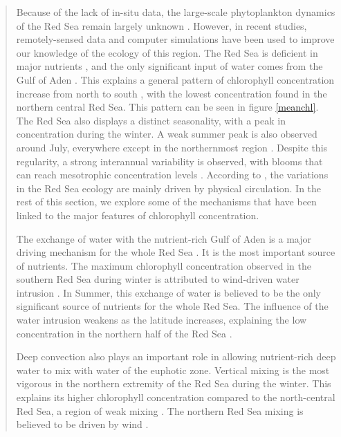 \begin{quotation}
Because of the lack of in-situ data, the large-scale phytoplankton dynamics of
the Red Sea remain largely unknown \citep{Raitsos2013, Triantafyllou2014}.
However, in recent studies, remotely-sensed data and computer simulations have
been used to improve our knowledge of the ecology of this region. The Red Sea
is deficient in major nutrients \citep{Weikert1987}, and the only significant
input of water comes from the Gulf of Aden \citep{Yao2015}. This explains a
general pattern of chlorophyll concentration increase from north to south
\citep{Raitsos2013}, with the lowest concentration found in the northern
central Red Sea. This pattern can be seen in figure \ref{meanchl}.  The Red Sea
also displays a distinct seasonality, with a peak in concentration during the
winter.  A weak summer peak is also observed around July, everywhere except in
the northernmost region \citep{Raitsos2013}. Despite this regularity, a strong
interannual variability is observed, with blooms that can reach mesotrophic
concentration levels \citep{Raitsos2013}. According to
\citet{Triantafyllou2014}, the variations in the Red Sea ecology are mainly
driven by physical circulation. In the rest of this section, we explore some of
the mechanisms that have been linked to the major features of chlorophyll
concentration.


The exchange of water with the nutrient-rich Gulf of Aden is a major driving
mechanism for the whole Red Sea \citep{Triantafyllou2014}. It is the most
important source of nutrients. The maximum chlorophyll concentration observed
in the southern Red Sea during winter is attributed to wind-driven water
intrusion \citep{Raitsos2013}. In Summer, this exchange of water is believed to
be the only significant source of nutrients for the whole Red Sea. The
influence of the water intrusion weakens as the latitude increases, explaining
the low concentration in the northern half of the Red Sea \citep{Raitsos2013}.

Deep convection also plays an important role in allowing nutrient-rich deep
water to mix with water of the euphotic zone. Vertical mixing is the most
vigorous in the northern extremity of the Red Sea during the winter. This
explains its higher chlorophyll concentration compared to the north-central Red
Sea, a region of weak mixing \citep{Raitsos2013}. The northern Red Sea mixing
is believed to be driven by wind \citep{Raitsos2013}.


\end{quotation}

